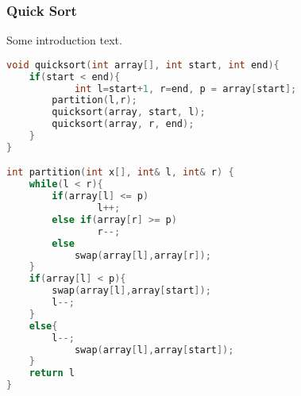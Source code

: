 \documentclass[main]{subfiles}
\begin{document}

\subsubsection{Quick Sort}
\renewcommand{\arraystretch}{1.5}


Some introduction text.

\scriptsize
\begin{lstlisting}[language=C++]
void quicksort(int array[], int start, int end){
    if(start < end){
    		int l=start+1, r=end, p = array[start];
        partition(l,r);
        quicksort(array, start, l);
        quicksort(array, r, end);
    }
}

int partition(int x[], int& l, int& r) {
    while(l < r){
        if(array[l] <= p)
    			l++;
      	else if(array[r] >= p)
        		r--;
  		else
			swap(array[l],array[r]);
  	}
  	if(array[l] < p){
   		swap(array[l],array[start]);
  		l--;
   	}
  	else{
   		l--;
    		swap(array[l],array[start]);
  	}
  	return l
}
\end{lstlisting}
\end{document}
